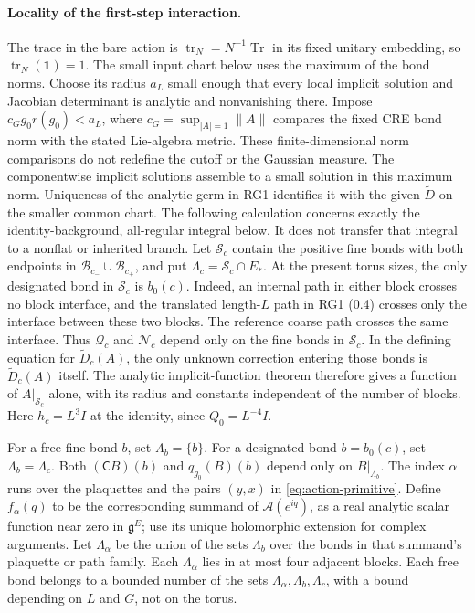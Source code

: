\documentclass[11pt]{article}
\newcommand{\tr}{\operatorname{tr}}
\newcommand{\id}{\mathbf 1}
\begin{document}
\paragraph{Locality of the first-step interaction.}
The trace in the bare action is $\tr_N=N^{-1}\operatorname{Tr}$ in its fixed unitary embedding, so $\tr_N(\id)=1$. The small input chart below uses the maximum of the bond norms. Choose its radius $a_L$ small enough that every local implicit solution and Jacobian determinant is analytic and nonvanishing there. Impose $c_Gg_0r(g_0)<a_L$, where $c_G=\sup_{|A|=1}\|A\|$ compares the fixed CRE bond norm with the stated Lie-algebra metric. These finite-dimensional norm comparisons do not redefine the cutoff or the Gaussian measure. The componentwise implicit solutions assemble to a small solution in this maximum norm. Uniqueness of the analytic germ in RG1 identifies it with the given $\widetilde D$ on the smaller common chart.
The following calculation concerns exactly the identity-background, all-regular integral below. It does not transfer that integral to a nonflat or inherited branch. Let $\mathcal S_c$ contain the positive fine bonds with both endpoints in $\mathcal B_{c_-}\cup\mathcal B_{c_+}$, and put $\Lambda_c=\mathcal S_c\cap E_*$. At the present torus sizes, the only designated bond in $\mathcal S_c$ is $b_0(c)$. Indeed, an internal path in either block crosses no block interface, and the translated length-$L$ path in RG1 (0.4) crosses only the interface between these two blocks. The reference coarse path crosses the same interface. Thus $\mathcal Q_c$ and $\mathcal N_c$ depend only on the fine bonds in $\mathcal S_c$. In the defining equation for $\widetilde D_c(A)$, the only unknown correction entering those bonds is $\widetilde D_c(A)$ itself. The analytic implicit-function theorem therefore gives a function of $A|_{\mathcal S_c}$ alone, with its radius and constants independent of the number of blocks. Here $h_c=L^3I$ at the identity, since $Q_0=L^{-4}I$.

For a free fine bond $b$, set $\Lambda_b=\{b\}$. For a designated bond $b=b_0(c)$, set $\Lambda_b=\Lambda_c$. Both $(\mathsf CB)(b)$ and $q_{g_0}(B)(b)$ depend only on $B|_{\Lambda_b}$. The index $\alpha$ runs over the plaquettes and the pairs $(y,x)$ in \eqref{eq:action-primitive}. Define $f_\alpha(q)$ to be the corresponding summand of $\mathscr A(e^{iq})$, as a real analytic scalar function near zero in $\mathfrak g^E$; use its unique holomorphic extension for complex arguments. Let $\Lambda_\alpha$ be the union of the sets $\Lambda_b$ over the bonds in that summand's plaquette or path family. Each $\Lambda_\alpha$ lies in at most four adjacent blocks. Each free bond belongs to a bounded number of the sets $\Lambda_\alpha,\Lambda_b,\Lambda_c$, with a bound depending on $L$ and $G$, not on the torus.
\end{document}
